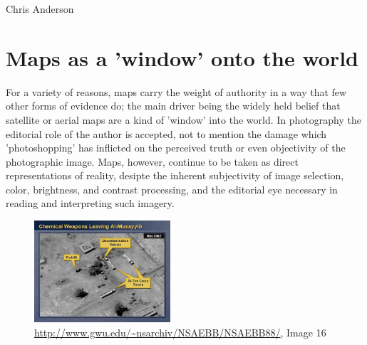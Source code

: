 \documentclass[11pt]{report}
\begin{document}
Chris Anderson 

\section{Maps as a 'window' onto the world}


For a variety of reasons, maps carry the weight of authority in a way that few other forms of evidence do; the main driver being the widely held belief that satellite or aerial maps are a kind of 'window' into the world. In photography the editorial role of the author is accepted, not to mention the damage which 'photoshopping' has inflicted on the perceived truth or even objectivity of the photographic image. Maps, however, continue to be taken as direct representations of reality, desipte the inherent subjectivity of image selection, color, brightness, and contrast processing, and the editorial eye necessary in reading and interpreting such imagery. 

\begin{figure}
	\begin{flushright}
		\includegraphics[width=0.45\textwidth]{images/iraq-image-16.jpg}
	\url{http://www.gwu.edu/~nsarchiv/NSAEBB/NSAEBB88/}, Image 16
	
	\end{flushright}
\end{figure}
\end{document}
